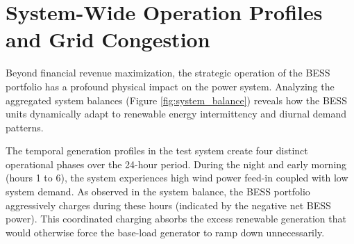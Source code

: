 \begin{table}[htpb]
    \centering
    \caption{Daily revenue stream breakdown comparing Arbitrage and aFRR profits across the Energy-Only and Multi-Service scenarios.}
    \label{tab:revenue_stats}
\end{table}

\section{System-Wide Operation Profiles and Grid Congestion} \label{sec:system_profiles}

Beyond financial revenue maximization, the strategic operation of the BESS portfolio has a profound physical impact on the power system. Analyzing the aggregated system balances (Figure \ref{fig:system_balance}) reveals how the BESS units dynamically adapt to renewable energy intermittency and diurnal demand patterns.

The temporal generation profiles in the test system create four distinct operational phases over the 24-hour period. During the night and early morning (hours 1 to 6), the system experiences high wind power feed-in coupled with low system demand. As observed in the system balance, the BESS portfolio aggressively charges during these hours (indicated by the negative net BESS power). This coordinated charging absorbs the excess renewable generation that would otherwise force the base-load generator to ramp down unnecessarily.

